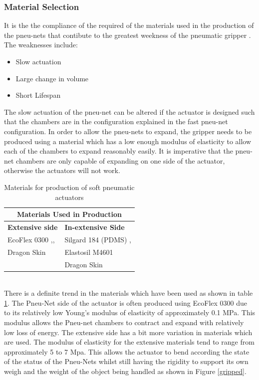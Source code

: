 \documentclass[11pt,twocolumn]{article}
\begin{document}
\subsubsection{Material Selection}
It is the the compliance of the required of the materials used in the production of the pneu-nets that contibute to the greatest weekness of the pneumatic gripper \cite{shepherd2011multigait}. The weaknesses include:
\begin{itemize}
\item Slow actuation
\item Large change in volume
\item Short Lifespan
\end{itemize}
The slow actuation of the pneu-net can be altered if the actuator is designed such that the chambers are in the configuration explained in the fast pneu-net configuration. In order to allow the pneu-nets to expand, the gripper needs to be produced using a material which has a low enough modulus of elasticity to allow each of the chambers to expand reasonably easily. It is imperative that the pneu-net chambers are only capable of expanding on one side of the actuator, otherwise the actuators will not work.
\newline
\begin{table}[!h]
\caption{Materials for production of soft pneumatic actuators}
\label{Pneumatic_table}
\centering
\begin{tabular}{ |p{4cm}|p{4cm}| }
 \hline
 \multicolumn{2}{|c|}{\textbf{Materials Used in Production}} \\
 \hline
 \textbf{Extensive side} & \textbf{In-extensive Side}\\
 \hline
 EcoFlex 0300 \cite{ilievski2011soft},\cite{bilodeau2015monolithic},\cite{mosadegh2014pneumatic}   & Silgard 184 (PDMS)  \cite{ilievski2011soft},\cite{bilodeau2015monolithic} \\
 Dragon Skin \cite{hao2016universal} &   Elastosil M4601 \cite{mosadegh2014pneumatic}\\
 & Dragon Skin \cite{hao2016universal}\\
 \hline
\end{tabular}
\end{table}
\\
\newline
There is a definite trend in the materials which have been used as shown in table \ref{Pneumatic_table}. The Pneu-Net side of the actuator is often produced using EcoFlex 0300 due to its relatively low Young's modulus of elasticity of approximately 0.1 MPa. This modulus allows the Pneu-net chambers to contract and expand with relatively low loss of energy. The extensive side has a bit more variation in materials which are used. The modulus of elasticity for the extensive materials tend to range from approximately 5 to 7 Mpa. This allows the actuator to bend according the state of the status of the Pneu-Nets whilst still having the rigidity to support its own weigh and the weight of the object being handled as shown in Figure \ref{gripped}.
\end{document}
